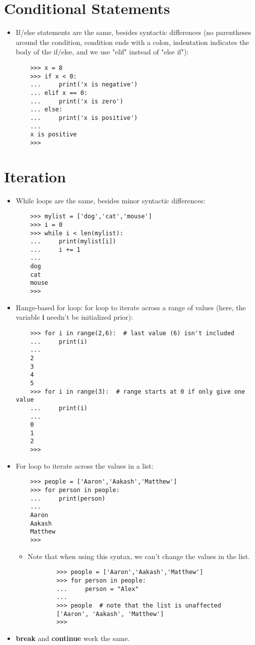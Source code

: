 \documentclass{article}
\begin{document}
\section{Conditional Statements}
\begin{itemize}
    \item If/else statements are the same, besides syntactic differences (no parentheses around the condition, condition ends with a colon, indentation indicates the body of the if/else, and we use "elif" instead of "else if"):
    \begin{lstlisting}
    >>> x = 8
    >>> if x < 0:
    ...     print('x is negative')
    ... elif x == 0:
    ...     print('x is zero')
    ... else:
    ...     print('x is positive')
    ...
    x is positive
    >>>
    \end{lstlisting}
\end{itemize}

\section{Iteration}
\begin{itemize}
    \item While loops are the same, besides minor syntactic differences:
    \begin{lstlisting}
    >>> mylist = ['dog','cat','mouse']
    >>> i = 0
    >>> while i < len(mylist):
    ...     print(mylist[i])
    ...     i += 1
    ...
    dog
    cat
    mouse
    >>>
    \end{lstlisting}
    \item Range-based for loop: for loop to iterate across a range of values (here, the variable \textbf{i} needn't be initialized prior):
    \begin{lstlisting}
    >>> for i in range(2,6):  # last value (6) isn't included
    ...     print(i)
    ...
    2
    3
    4
    5
    >>> for i in range(3):  # range starts at 0 if only give one value
    ...     print(i)
    ...
    0
    1
    2
    >>>
    \end{lstlisting}
    \item For loop to iterate across the values in a list:
    \begin{lstlisting}
    >>> people = ['Aaron','Aakash','Matthew']
    >>> for person in people:
    ...     print(person)
    ...
    Aaron
    Aakash
    Matthew
    >>>
    \end{lstlisting}
    \begin{itemize}
        \item Note that when using this syntax, we can't change the values in the list.
        \begin{lstlisting}
        >>> people = ['Aaron','Aakash','Matthew']
        >>> for person in people:
        ...     person = "Alex"
        ...
        >>> people  # note that the list is unaffected
        ['Aaron', 'Aakash', 'Matthew']
        >>>
        \end{lstlisting}
    \end{itemize}
    \item \textbf{break} and \textbf{continue} work the same.
\end{itemize}
\end{document}
